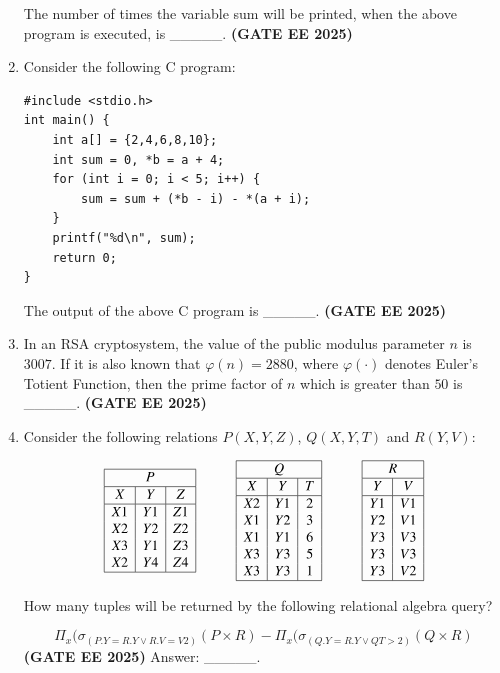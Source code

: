 \documentclass[journal,12pt,onecolumn]{IEEEtran}
\theoremstyle{remark}
\begin{document}
\begin{enumerate}
The number of times the variable sum will be printed, when the above program is executed, is \_\_\_\_\_. \hfill \textbf{(GATE EE 2025)}



\item Consider the following C program:
\begin{verbatim}
#include <stdio.h>
int main() {
    int a[] = {2,4,6,8,10};
    int sum = 0, *b = a + 4;
    for (int i = 0; i < 5; i++) {
        sum = sum + (*b - i) - *(a + i);
    }
    printf("%d\n", sum);
    return 0;
}
\end{verbatim}

The output of the above C program is \_\_\_\_\_. \hfill \textbf{(GATE EE 2025)}


\item In an RSA cryptosystem, the value of the public modulus parameter $n$ is $3007$.  
If it is also known that $\varphi(n) = 2880$, where $\varphi(\cdot)$ denotes Euler's Totient Function,  
then the prime factor of $n$ which is greater than $50$ is \_\_\_\_\_. \hfill \textbf{(GATE EE 2025)}

\item  Consider the following relations $P(X,Y,Z)$, $Q(X,Y,T)$ and $R(Y,V)$:

\[
\begin{array}{|c|c|c|}
\hline
\multicolumn{3}{|c|}{P} \\
\hline
X & Y & Z \\
\hline
X1 & Y1 & Z1 \\
X2 & Y2 & Z2 \\
X3 & Y1 & Z3 \\
X2 & Y4 & Z4 \\
\hline
\end{array}
\hspace{1cm}
\begin{array}{|c|c|c|}
\hline
\multicolumn{3}{|c|}{Q} \\
\hline
X & Y & T \\
\hline
X2 & Y1 & 2 \\
X1 & Y2 & 3 \\
X1 & Y1 & 6 \\
X3 & Y3 & 5 \\
X3 & Y3 & 1 \\
\hline
\end{array}
\hspace{1cm}
\begin{array}{|c|c|}
\hline
\multicolumn{2}{|c|}{R} \\
\hline
Y & V \\
\hline
Y1 & V1 \\
Y2 & V1 \\
Y3 & V3 \\
Y3 & V3 \\
Y3 & V2 \\
\hline
\end{array}
\]


How many tuples will be returned by the following relational algebra query?

\[
\Pi_x(\sigma_{(P.Y=R.Y \lor R.V=V2)}(P \times R)-\Pi_x(\sigma_{(Q.Y=R.Y \lor QT>2)}(Q \times R)
\]
\hfill \textbf{(GATE EE 2025)}
Answer: \_\_\_\_\_.

\end{enumerate}
\end{document}
